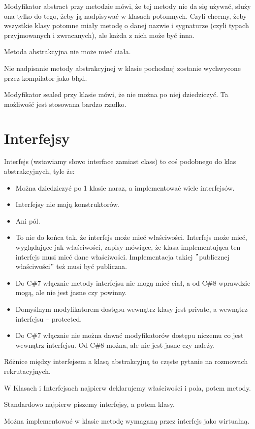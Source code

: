 \documentclass[10pt]{article}
\begin{document}
Modyfikator abstract przy metodzie mówi, że tej metody nie da się używać, służy ona tylko do tego, żeby ją nadpisywać w klasach potomnych. Czyli chcemy, żeby wszystkie klasy potomne miały metodę o danej nazwie i sygnaturze (czyli typach przyjmowanych i zwracanych), ale każda z nich może być inna.

Metoda abstrakcyjna nie może mieć ciała.

Nie nadpisanie metody abstrakcyjnej w klasie pochodnej zostanie wychwycone przez kompilator jako błąd.

Modyfikator sealed przy klasie mówi, że nie można po niej dziedziczyć. Ta możliwość jest stosowana bardzo rzadko.

\section{Interfejsy}
Interfejs (wstawiamy słowo interface zamiast class) to coś podobnego do klas abstrakcyjnych, tyle że:
\begin{itemize}
\item Można dziedziczyć po 1 klasie naraz, a implementować wiele interfejsów.
\item Interfejsy nie mają konstruktorów.
\item Ani pól.
\item To nie do końca tak, że interfejs może mieć właściwości. Interfejs może mieć, wyglądające jak właściwości, zapisy mówiące, że klasa implementująca ten interfejs musi mieć dane właściwości. Implementacja takiej $"$publicznej właściwości$"$ też musi być publiczna.
\item Do C\#7 włącznie metody interfejsu nie mogą mieć ciał, a od C\#8 wprawdzie mogą, ale nie jest jasne czy powinny.
\item Domyślnym modyfikatorem dostępu wewnątrz klasy jest private, a wewnątrz interfejsu -- protected.
\item Do C\#7 włącznie nie można dawać modyfikatorów dostępu niczemu co jest wewnątrz interfejsu. Od C\#8 można, ale nie jest jasne czy należy.
\end{itemize}
Różnice między interfejsem a klasą abstrakcyjną to częste pytanie na rozmowach rekrutacyjnych.

W Klasach i Interfejsach najpierw deklarujemy właściwości i pola, potem metody.

Standardowo najpierw piszemy interfejsy, a potem klasy.

Można implementować w klasie metodę wymaganą przez interfejs jako wirtualną.
\end{document}
